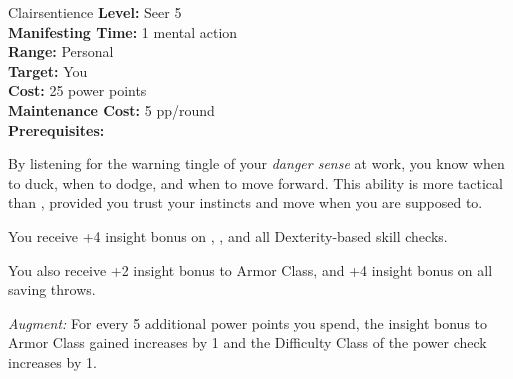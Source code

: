 {Clairsentience}
{
	\textbf{Level:}
	Seer 5\\
	\textbf{Manifesting Time:}
	1 mental action\\
	\textbf{Range:}
	Personal\\
	\textbf{Target:}
	You\\
	\textbf{Cost:}
	25 power points\\
	\textbf{Maintenance Cost:}
	5 pp/round\\
	\textbf{Prerequisites:}
	\\
}
{
	By listening for the warning tingle of your \emph{danger sense} at work, you know when to duck, when to dodge, and when to move forward. This ability is more tactical than , provided you trust your instincts and move when you are supposed to.

	You receive +4 insight bonus on , , and all Dexterity-based skill checks.

	You also receive +2 insight bonus to Armor Class, and +4 insight bonus on all saving throws.

	\textit{Augment:} For every 5 additional power points you spend, the insight bonus to Armor Class gained increases by 1 and the Difficulty Class of the power check increases by 1.
}